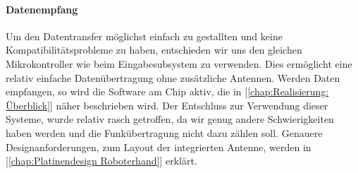 \documentclass[titlepage,12pt,twoside]{article}
\begin{document}
\paragraph{Datenempfang}
\hfill \break
\hfill \break
Um den Datentransfer möglichst einfach zu gestallten und keine Kompatibilitätsprobleme zu haben, entschieden wir uns den gleichen Mikrokontroller
wie beim Eingabesubsystem zu verwenden. Dies ermöglicht eine relativ einfache Datenübertragung ohne zusätzliche Antennen. Werden Daten empfangen,
so wird die Software am Chip aktiv, die in [\textcolor{blue}{\autoref{chap:Realisierung: Überblick}}] näher beschrieben wird. Der
Entschluss zur Verwendung dieser  Systeme, wurde relativ rasch getroffen, da wir genug andere Schwierigkeiten haben werden und 
die Funkübertragung nicht dazu zählen soll. Genauere Designanforderungen, zum Layout der integrierten Antenne, werden in [\textcolor{blue}{\autoref{chap:Platinendesign Roboterhand}}] erklärt.
\end{document}
